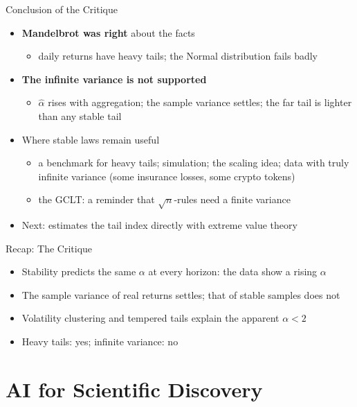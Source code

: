 \begin{frame}{Conclusion of the Critique}
\itemsize{\small}
\begin{itemize}
    \item \textbf{Mandelbrot was right} about the facts
    \begin{itemize}
        \item daily returns have heavy tails; the Normal distribution fails badly
    \end{itemize}
    \item \textbf{The infinite variance is not supported}
    \begin{itemize}
        \item $\hat\alpha$ rises with aggregation; the sample variance settles; the far tail is lighter than any stable tail
    \end{itemize}
    \item Where stable laws remain useful
    \begin{itemize}
        \item a benchmark for heavy tails; simulation; the scaling idea; data with truly infinite variance (some insurance losses, some crypto tokens)
        \item the GCLT: a reminder that $\sqrt{n}$-rules need a finite variance
    \end{itemize}
    \item Next:  estimates the tail index directly with extreme value theory
\end{itemize}
\end{frame}

\begin{frame}{Recap: The Critique}
\itemsize{\small}
\begin{itemize}
    \item Stability predicts the same $\alpha$ at every horizon: the data show a rising $\alpha$
    \item The sample variance of real returns settles; that of stable samples does not
    \item Volatility clustering and tempered tails explain the apparent $\alpha < 2$
    \item Heavy tails: yes; infinite variance: no
\end{itemize}
\end{frame}


\section{AI for Scientific Discovery}

